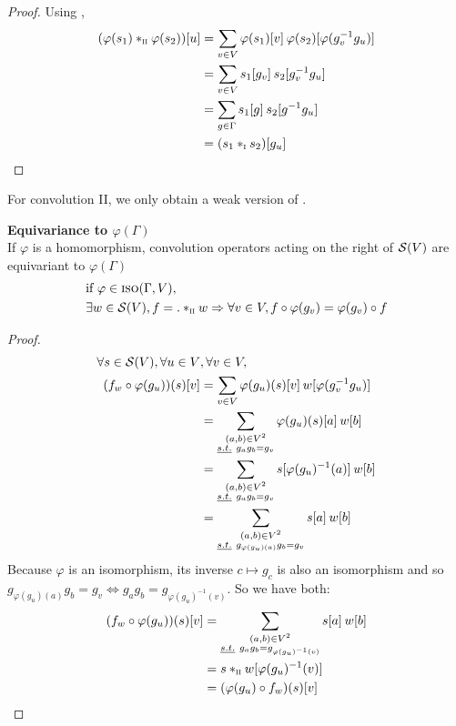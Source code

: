 \begin{proof}
Using ,
\begin{align*}
(\varphi(s_1) \ast_{\II} \varphi(s_2))[u] & = \displaystyle \sum_{v \in V} \varphi(s_1)[v] \h{2} \varphi(s_2)[\varphi(g_v^{-1}g_u)]\\
 & = \displaystyle \sum_{v \in V} s_1[g_v] \h{2} s_2[g_v^{-1}g_u]\\
 & = \displaystyle \sum_{g \in \Gamma} s_1[g] \h{2} s_2[g^{-1}g_u]\\
 & = (s_1 \ast_{\I} s_2)[g_u]
\end{align*}
\end{proof}

For convolution II, we only obtain a weak version of .

\begin{proposition}\textbf{Equivariance to $\varphi(\Gamma)$}\\
If $\varphi$ is a homomorphism, convolution operators acting on the right of $\cs(V)$ are equivariant to $\varphi(\Gamma)$ \ie
\begin{align*}
& \text{if } \varphi \in \iso(\Gamma, V),\\
& \exists w \in \cs(V), f = . \ast_{\II} w \Rightarrow \forall v \in V, f \circ \varphi(g_v) = \varphi(g_v) \circ f
\end{align*}
\label{prop:equiV}
\end{proposition}

\begin{proof}
\begin{align*}
\forall s \in \cs(V), \forall u \in V & ,\forall v \in V,\\
(f_w \circ \varphi(g_u)) (s) [v]
& = \displaystyle \sum_{v \in V} \varphi(g_u)(s)[v] \h{2} w[\varphi(g_v^{-1}g_u)]\\
& = \sum_{\substack{(a,b) \in V^2 \\ \st g_ag_b=g_v }} \varphi(g_u)(s)[a] \h{2} w[b]\\
& = \sum_{\substack{(a,b) \in V^2 \\ \st g_ag_b=g_v }} s[\varphi(g_u)^{-1}(a)] \h{2} w[b]\\
& = \sum_{\substack{(a,b) \in V^2 \\ \st g_{\varphi(g_u)(a)}g_b=g_v }} s[a] \h{2} w[b]\\
\end{align*}
Because $\varphi$ is an isomorphism, its inverse $c \mapsto g_c$ is also an isomorphism and so $g_{\varphi(g_u)(a)}g_b=g_v \Leftrightarrow g_{a}g_b=g_{\varphi(g_u)^{-1}(v)}$. So we have both:
\begin{align*}
(f_w \circ \varphi(g_u)) (s) [v] & = \sum_{\substack{(a,b) \in V^2 \\ \st g_{a}g_b=g_{\varphi(g_u)^{-1}(v)} }} s[a] \h{2} w[b]\\
& = s \ast_{\II} w [\varphi(g_u)^{-1}(v)]\\
& = (\varphi(g_u) \circ f_w) (s) [v]
\end{align*}
\end{proof}

